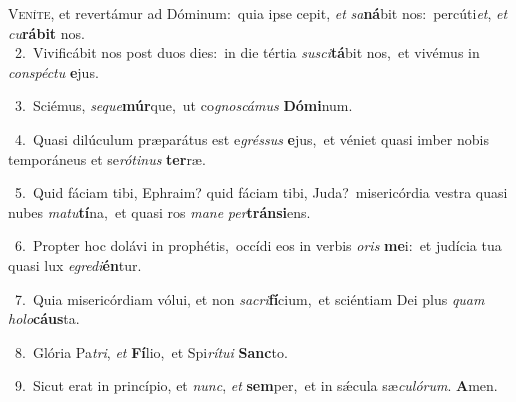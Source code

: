 \lettrine{\initial\textcolor{\initialcolor}{V}}{eníte,} et revertámur ad Dóminum:~\dagger quia ipse cepit, \textit{et} \textit{sa}\-\textbf{ná}bit nos:~\star percúti\-\textit{et}\-, \textit{et} \textit{cu}\-\textbf{rá}\textbf{bit} nos.\\
{\numbfont\textcolor{\numbcolor}{~2.}}~Vivificábit nos post duos dies:~\dagger in die tértia \textit{su}\-\textit{sci}\textbf{tá}bit nos,~\star et vivémus in \textit{con}\-\textit{spéc}\textit{tu} \textbf{e}\-jus.\par
{\numbfont\textcolor{\numbcolor}{~3.}}~Sciémus, \textit{se}\-\textit{que}\textbf{múr}que,~\star ut co\-\textit{gnos}\-\textit{cá}\textit{mus} \textbf{Dó}\-\textbf{mi}num.\par
{\numbfont\textcolor{\numbcolor}{~4.}}~Quasi dilúculum præparátus est e\-\textit{grés}\-\textit{sus} \textbf{e}\-jus,~\star et véniet quasi imber nobis temporáneus et se\-\textit{ró}\-\textit{ti}\textit{nus} \textbf{ter}\-ræ.\par
{\numbfont\textcolor{\numbcolor}{~5.}}~Quid fáciam tibi, Ephraim? quid fáciam tibi, Juda?~\dagger misericórdia vestra quasi nubes \textit{ma}\-\textit{tu}\textbf{tí}na,~\star et quasi ros \textit{ma}\-\textit{ne} \textit{per}\-\textbf{tráns}\textbf{i}ens.\par
{\numbfont\textcolor{\numbcolor}{~6.}}~Propter hoc dolávi in prophétis,~\dagger occídi eos in verbis \textit{o}\-\textit{ris} \textbf{me}\-i:~\star et judícia tua quasi lux \textit{e}\-\textit{gre}\textit{di}\textbf{én}tur.\par
{\numbfont\textcolor{\numbcolor}{~7.}}~Quia misericórdiam vólui, et non \textit{sa}\-\textit{cri}\textbf{fí}cium,~\star et sciéntiam Dei plus \textit{quam} \textit{ho}\-\textit{lo}\textbf{cáus}ta.\par
{\numbfont\textcolor{\numbcolor}{~8.}}~Glória Pa\-\textit{tri}\-, \textit{et} \textbf{Fí}\-lio,~\star et Spi\-\textit{rí}\-\textit{tu}\textit{i} \textbf{Sanc}\-to.\par
{\numbfont\textcolor{\numbcolor}{~9.}}~Sicut erat in princípio, et \textit{nunc}\-, \textit{et} \textbf{sem}\-per,~\star et in sǽcula sæ\-\textit{cu}\-\textit{ló}\textit{rum}. \textbf{A}\-men.\par

